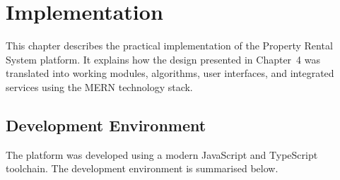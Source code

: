 
\chapter{Implementation}

This chapter describes the practical implementation of the Property Rental System platform. It explains how the design presented in Chapter~4 was translated into working modules, algorithms, user interfaces, and integrated services using the MERN technology stack.


\section{Development Environment}

The platform was developed using a modern JavaScript and TypeScript toolchain. The development environment is summarised below.

